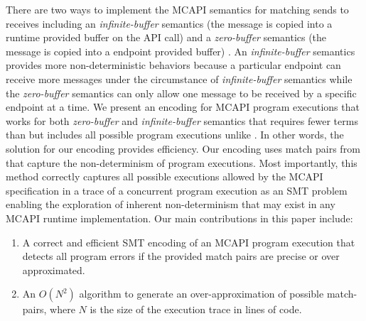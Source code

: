 There are two ways to implement the MCAPI semantics for matching sends to receives including an \textit{infinite-buffer} semantics (the message is copied into a runtime provided buffer on the API call) and a \textit{zero-buffer} semantics (the message is copied into a endpoint provided buffer) \cite{sarvani:fm09}.  An \textit{infinite-buffer} semantics provides more non-deterministic behaviors because a particular endpoint can receive more messages under the circumstance of \textit{infinite-buffer} semantics while the \textit{zero-buffer} semantics can only allow one message to be received by a specific endpoint at a time. We present an encoding for MCAPI program executions that works for both \textit{zero-buffer} and \textit{infinite-buffer} semantics that requires fewer terms than \cite{elwakil:padtad10} but includes all possible program executions unlike \cite{elwakil:padtad10}.  In other words, the solution for our encoding provides efficiency. Our encoding uses match pairs from \cite{sharma:fmcad09} that capture the non-determinism of program executions. Most importantly, this method correctly captures all possible executions allowed by the MCAPI specification in a trace of a concurrent program execution as an SMT problem enabling the exploration of inherent non-determinism that may exist in any MCAPI runtime implementation.
Our main contributions in this paper include:

\begin{enumerate}
\item  A correct and efficient SMT encoding of an MCAPI program execution that detects all program errors if the provided match pairs are precise or over approximated.
\item  An $O(N^2)$ algorithm to generate an over-approximation of possible match-pairs, where $N$ is the size of the execution trace in lines of code.
\end{enumerate}

